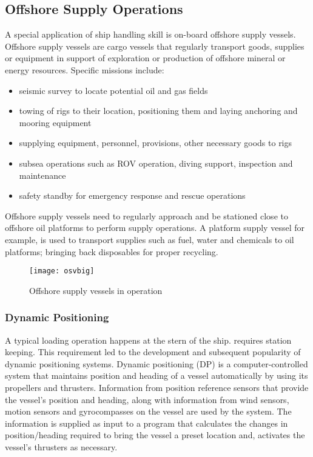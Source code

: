 
\subsection{Offshore Supply Operations}
A special application of ship handling skill is on-board offshore supply vessels. Offshore supply vessels are cargo vessels that regularly transport goods, supplies or equipment in support of exploration or production of offshore mineral or energy resources. Specific missions include: 
\begin{itemize}
\item seismic survey to locate potential oil and gas fields
\item towing of rigs to their location, positioning them and laying anchoring and mooring equipment
\item supplying equipment, personnel, provisions, other necessary goods to rigs
\item subsea operations such as ROV operation, diving support, inspection and maintenance
\item safety standby for emergency response and rescue operations
\end{itemize}
 Offshore supply vessels need to regularly approach and be stationed close to offshore oil platforms to perform supply operations. A platform supply vessel for example, is used to transport supplies such as fuel, water and chemicals to oil platforms; bringing back disposables for proper recycling. 
 
\begin{figure}[h]
	\centering
	\texttt{[image: osvbig]}
	\caption{Offshore supply vessels in operation}
	\label{fig:shipforces}
\end{figure}

\subsubsection{Dynamic Positioning}

A typical loading operation happens at the stern of the ship. requires station keeping.
This requirement led to the development and subsequent popularity of dynamic positioning systems. Dynamic positioning (DP) is a computer-controlled system that maintains position and heading of a vessel automatically by using its propellers and thrusters. Information from position reference sensors that provide the vessel’s position and heading, along with information from wind sensors, motion sensors and gyrocompasses on the vessel are used by the system. The information is supplied as input to a program that calculates the changes in position/heading required to bring the vessel a preset location and, activates the vessel’s thrusters as necessary.


